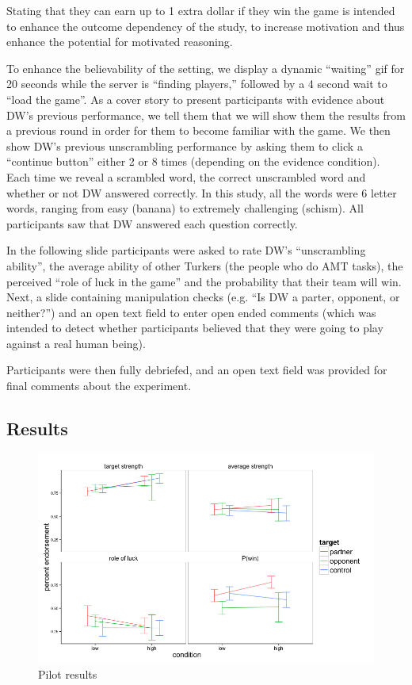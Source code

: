 \documentclass{article}
\begin{document}
Stating that they can earn up to 1 extra dollar if they win the game is intended to enhance the outcome dependency of the study, to increase motivation and thus enhance the potential for motivated reasoning. 

To enhance the believability of the setting, we display a dynamic ``waiting'' gif for 20 seconds while the server is ``finding players,'' followed by a 4 second wait to ``load the game''. As a cover story to present participants with evidence about DW's previous performance, we tell them that we will show them the results from a previous round in order for them to become familiar with the game. We then show DW's previous unscrambling performance by asking them to click a ``continue button'' either 2 or 8 times (depending on the evidence condition). Each time we reveal a scrambled word, the correct unscrambled word and whether or not DW answered correctly. In this study, all the words were 6 letter words, ranging from easy (banana) to extremely challenging (schism). All participants saw that DW answered each question correctly.

In the following slide participants were asked to rate DW's ``unscrambling ability'', the average ability of other Turkers (the people who do AMT tasks), the perceived ``role of luck in the game'' and the probability that their team will win. Next, a slide containing manipulation checks (e.g. ``Is DW a parter, opponent, or neither?'') and an open text field to enter open ended comments (which was intended to detect whether participants believed that they were going to play against a real human being).

Participants were then fully debriefed, and an open text field was provided for final comments about the experiment. 




\subsection{Results}


\begin{figure}
\centering
    \includegraphics[width=\columnwidth]{motiv-facetQuestion_mht0_n140-lines}
    \caption{Pilot results}
      \label{fig:motiv1}
\end{figure}
\end{document}
